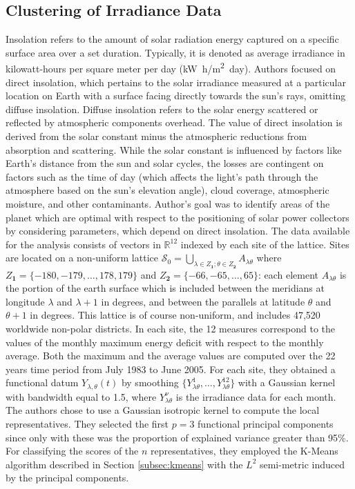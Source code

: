 \subsection{Clustering of Irradiance Data}
\label{subsec:irradiance}
Insolation refers to the amount of solar radiation energy captured on a specific surface area over a set duration. Typically, it is denoted as average irradiance in kilowatt-hours per square meter per day (\unit{\kilo\watt.h/\metre^2.day}). Authors focused on direct insolation, which pertains to the solar irradiance measured at a particular location on Earth with a surface facing directly towards the sun's rays, omitting diffuse insolation. Diffuse insolation refers to the solar energy scattered or reflected by atmospheric components overhead. The value of direct insolation is derived from the solar constant minus the atmospheric reductions from absorption and scattering. While the solar constant is influenced by factors like Earth's distance from the sun and solar cycles, the losses are contingent on factors such as the time of day (which affects the light's path through the atmosphere based on the sun's elevation angle), cloud coverage, atmospheric moisture, and other contaminants. Author's goal was to identify areas of the planet which are optimal with respect to the positioning of solar power collectors by considering parameters, which depend on direct insolation. The data available for the analysis consists of vectors in $\mathbb{R}^{12}$ indexed by each site of the lattice. Sites are located on a non-uniform lattice $\mathcal{S}_0=\bigcup_{\lambda \in Z_{\mathbf{1}};\theta \in Z_{\mathbf{2}}}A_{\lambda\theta}$ where $Z_{\mathbf{1}} = \{ -180, -179, \dots, 178, 179\}$ and $Z_{\mathbf{2}} = \{ -66, -65, \dots, 65\}$: each element $A_{\lambda\theta}$ is the portion of the earth surface which is included between the meridians at longitude $\lambda$ and $\lambda + 1$ in degrees, and between the parallels at latitude $\theta$ and $\theta + 1$ in degrees. This lattice is of course non-uniform, and includes 47,520 worldwide non-polar districts. In each site, the 12 measures correspond to the values of the monthly maximum energy deficit with respect to the monthly average. Both the maximum and the average values are computed over the 22 years time period from July 1983 to June 2005. For each site, they obtained a functional datum $Y_{\lambda,\theta}(t)$ by smoothing $\{Y_{\lambda\theta}^1, \dots, Y_{\lambda\theta}^12\}$ with a Gaussian kernel with bandwidth equal to 1.5, where $Y_{\lambda\theta}^\nu$ is the irradiance data for each month. The authors chose to use a Gaussian isotropic kernel to compute the local representatives. They selected the first $p=3$ functional principal components since only with these was the proportion of explained variance greater than 95\%. For classifying the scores of the $n$ representatives, they employed the K-Means algorithm described in Section \ref{subsec:kmeans} with the $L^2$ semi-metric induced by the principal components.

